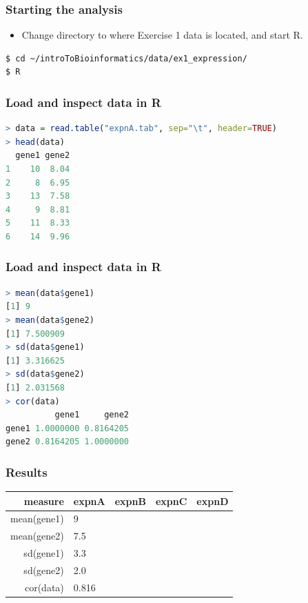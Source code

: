 \begin{frame}[fragile]
  \frametitle{Starting the analysis}
  \begin{itemize}
    \item Change directory to where Exercise 1 data is located, and start R.
  \end{itemize}
\begin{lstlisting}[language=bash]
$ cd ~/introToBioinformatics/data/ex1_expression/
$ R
\end{lstlisting}
\end{frame}

\begin{frame}[fragile]
  \frametitle{Load and inspect data in R}
\begin{lstlisting}[language=R]
> data = read.table("expnA.tab", sep="\t", header=TRUE)
> head(data)
  gene1 gene2
1    10  8.04
2     8  6.95
3    13  7.58
4     9  8.81
5    11  8.33
6    14  9.96
\end{lstlisting}
\end{frame}

\begin{frame}[fragile]
  \frametitle{Load and inspect data in R}
\begin{lstlisting}[language=R]
> mean(data$gene1)
[1] 9
> mean(data$gene2)
[1] 7.500909
> sd(data$gene1)
[1] 3.316625
> sd(data$gene2)
[1] 2.031568
> cor(data)
          gene1     gene2
gene1 1.0000000 0.8164205
gene2 0.8164205 1.0000000
\end{lstlisting}
\end{frame}

\begin{frame}
  \frametitle{Results}
  \begin{center}
  \begin{tabular}{r|l|l|l|l}
          measure & expnA & expnB & expnC & expnD \\
	  \hline
	  mean(gene1) & 9     &  &  & \\
	  mean(gene2) & 7.5   &  &  & \\
  	  sd(gene1)   & 3.3   &  &  & \\
  	  sd(gene2)   & 2.0   &  &  & \\  
	  cor(data)   & 0.816 &  &  & \\  
  \end{tabular}
  \end{center}
\end{frame}

